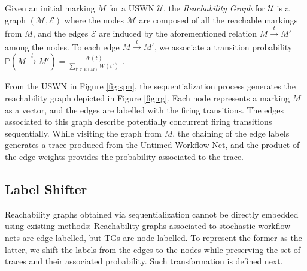 \begin{definition}
	Given an initial marking $M$ for a USWN $\mathcal{U}$,  the \textit{Reachability Graph} for $\mathcal{U}$ is a graph 
	$(\mathcal{M},\mathcal{E})$ where the nodes  $\mathcal{M}$ are composed of all the reachable markings from $M$, 
	and the edges $\mathcal{E}$ are induced by the aforementioned relation $M\overset{t}{\to}M'$ among the 
	nodes. To each edge $M\overset{t}{\to}M'$, we associate a transition probability $\mathbb{P}\left(M\overset{t}{\to}M'\right)=\frac{W(t)}{\sum_{t'\in E(M)}W(t')}$ \cite{spdwe}. 
\end{definition}

\begin{example}
From the USWN in Figure \ref{fig:spn}, the sequentialization process generates the reachability graph depicted in 
Figure \ref{fig:rg}. Each node represents a marking $M$ as a vector, and the edges are labelled with the firing transitions. 
The edges associated to this graph describe potentially concurrent firing transitions sequentially. While visiting the graph from 
$M$, the chaining of the edge labels generates a trace produced from the Untimed Workflow Net, and the product of the edge 
weights provides the probability associated to the trace.
\end{example}



\subsection{Label Shifter}\label{sec:LSift}
Reachability graphs obtained via sequentialization cannot be directly embedded using existing methods:  Reachability graphs 
associated to stochastic workflow nets are edge labelled, but TGs are node labelled. To represent the former as the latter, we 
shift the labels from the edges to the nodes  while preserving the set of traces and their associated probability. 
Such transformation is defined next.


